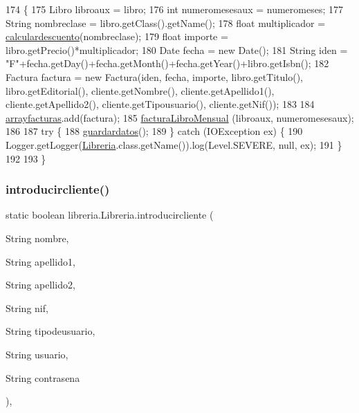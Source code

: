 \begin{DoxyCode}
174                                                                                                        \{
175          Libro libroaux = libro;
176          \textcolor{keywordtype}{int} numeromesesaux = numeromeses;
177          String nombreclase = libro.getClass().getName();
178          \textcolor{keywordtype}{float} multiplicador = \mbox{\hyperlink{classlibreria_1_1_libreria_a33f2cc093f3c15f09e146283e0c025d7}{calculardescuento}}(nombreclase);
179          \textcolor{keywordtype}{float} importe = libro.getPrecio()*multiplicador;
180          Date fecha = \textcolor{keyword}{new} Date();
181          String iden = \textcolor{stringliteral}{"F"}+fecha.getDay()+fecha.getMonth()+fecha.getYear()+libro.getIsbn();
182          Factura factura = \textcolor{keyword}{new} Factura(iden, fecha, importe, libro.getTitulo(), libro.getEditorial(), 
      cliente.getNombre(), cliente.getApellido1(), cliente.getApellido2(), cliente.getTipousuario(), cliente.getNif());
183          
184          \mbox{\hyperlink{classlibreria_1_1_libreria_a1b6aaea2b6d1d95a7e25b85881e82721}{arrayfacturas}}.add(factura);
185          \mbox{\hyperlink{classlibreria_1_1_libreria_ad54897f12a3077bb2f29f51663049d20}{facturaLibroMensual}} (libroaux, numeromesesaux);
186          
187     \textcolor{keywordflow}{try} \{
188         \mbox{\hyperlink{classlibreria_1_1_libreria_abc10249e70e74a9ba55a081bbf23cfcd}{guardardatos}}();
189     \} \textcolor{keywordflow}{catch} (IOException ex) \{
190         Logger.getLogger(\mbox{\hyperlink{classlibreria_1_1_libreria_a93220dd4de47ee3b7ef4b2a90701c253}{Libreria}}.class.getName()).log(Level.SEVERE, null, ex);
191     \}
192          
193      \}
\end{DoxyCode}
\mbox{\label{classlibreria_1_1_libreria_a0c70e18fd24cf773ee523d7fb77fd5b6}} 
\subsubsection{\texorpdfstring{introducircliente()}{introducircliente()}}
{\footnotesize\ttfamily static boolean libreria.\+Libreria.\+introducircliente (\begin{DoxyParamCaption}\item[{String}]{nombre,  }\item[{String}]{apellido1,  }\item[{String}]{apellido2,  }\item[{String}]{nif,  }\item[{String}]{tipodeusuario,  }\item[{String}]{usuario,  }\item[{String}]{contrasena }\end{DoxyParamCaption})\hspace{0.3cm}{\ttfamily [inline]}, {\ttfamily [static]}}

